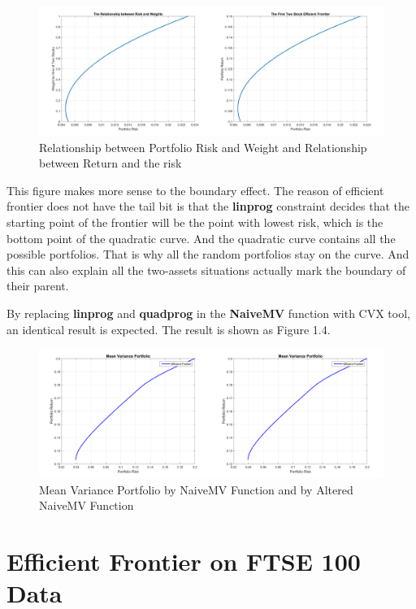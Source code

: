\documentclass[paper=a4, fontsize=11pt]{article} %
\numberwithin{equation}{section} %
\numberwithin{figure}{section} %
\numberwithin{table}{section} %
\begin{document}
\begin{figure}[h!]
	\centering
	\includegraphics[width=18cm]{fig2_3.png}
	\caption{Relationship between Portfolio Risk and Weight and Relationship between Return and the risk}
\end{figure}

This figure makes more sense to the boundary effect. The reason of efficient frontier does not have the tail bit is that the \textbf{linprog} constraint decides that the starting point of the frontier will be the point with lowest risk, which is the bottom point of the quadratic curve. And the quadratic curve contains all the possible portfolios. That is why all the random portfolios stay on the curve. And this can also explain all the two-assets situations actually mark the boundary of their parent. 

\newpage
By replacing \textbf{linprog} and \textbf{quadprog} in the \textbf{NaiveMV} function with CVX tool, an identical result is expected. The result is shown as Figure 1.4.

\begin{figure}[h!]
	\centering
	\includegraphics[width=18cm]{fig0_0.png}
	\caption{Mean Variance Portfolio by NaiveMV Function and by Altered NaiveMV Function}
\end{figure}

\section{Efficient Frontier on FTSE 100 Data}
\end{document}
